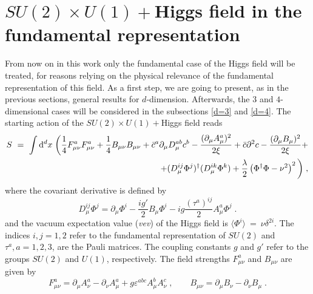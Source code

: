 \section{$SU(2)\times U(1)+$Higgs field in the fundamental representation}
\label{The Electroweak theory}



From now on in this work only the fundamental case of the Higgs field will be treated, for reasons relying on the physical relevance of the fundamental representation of this field. As a first step, we are going to present, as in the previous sections, general results for $d$-dimension. Afterwards, the $3$ and $4$-dimensional cases will be considered in the subsections \ref{d=3} and \ref{d=4}. The starting action of the $SU(2) \times U(1)+$Higgs field reads
\begin{eqnarray}
S ~=~ \int \mathrm{d}^{d}x  \;  \bigg(\frac{1}{4}  F_{\mu \nu }^{a} F_{\mu \nu }^{a}  +  \frac{1}{4} B_{\mu\nu} B_{\mu\nu} +{\bar c}^a \partial_\mu D^{ab}_\mu c^b - \frac{(\partial_\mu A^a_\mu)^{2}}{2\xi} 
 + {\bar c}\partial^2 c  - \frac{(\partial_\mu B_\mu)^{2}}{2\xi}  +
\nonumber \\
+
(D_{\mu }^{ij}\Phi^{j})^{\dagger}( D_{\mu }^{ik}\Phi^{k})+\frac{\lambda }{2}\left(\Phi^{\dagger}\Phi - \nu^{2}\right)^{2}   \bigg)  \;,
\label{Sf}
\end{eqnarray}
where the covariant derivative is defined by
\begin{equation}
D_{\mu }^{ij}\Phi^{j} =\partial _{\mu }\Phi^{i} - \frac{ig'}{2}B_{\mu}\Phi^{i} -   ig \frac{(\tau^a)^{ij}}{2}A_{\mu }^{a}\Phi^{j}  \;.
\end{equation}
and the vacuum expectation value (\textit{vev}) of the Higgs field is $\langle \Phi^{i} \rangle ~=~ \nu\delta^{2i}$.
The indices $i,j=1,2$ refer to the fundamental representation of $SU(2)$ and $\tau^a, a=1,2,3$, are the Pauli matrices. The coupling constants $g$ and $g'$ refer to the groups $SU(2)$ and $U(1)$, respectively. The field strengths $F^a_{\mu\nu}$ and $B_{\mu\nu}$ are given by
\begin{equation}
F^a_{\mu\nu} = \partial_\mu A^a_\nu -\partial_\nu A^a_\mu + g \varepsilon^{abc} A^b_\mu A^c_\nu \;, \qquad B_{\mu \nu} = \partial_\mu B_\nu -\partial_\nu B_\mu  \;.
\label{fs}
\end{equation}

